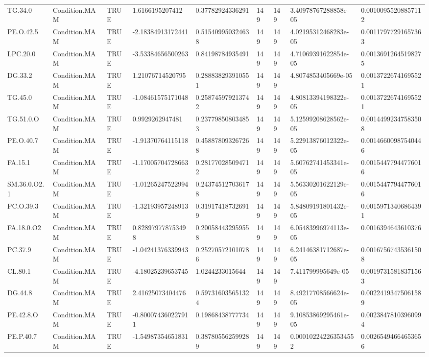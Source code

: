 \begin{longtable}{lllllllll}
TG.34.0 & Condition.MAM & TRUE & 1.6166195207412 & 0.37782924336291 & 149 & 149 & 3.40978767288858e-05 & 0.00100955208857112 \\
PE.O.42.5 & Condition.MAM & TRUE & -2.18384913172441 & 0.515409950324638 & 149 & 149 & 4.02195312468283e-05 & 0.00117977291657363 \\
LPC.20.0 & Condition.MAM & TRUE & -3.53384656500263 & 0.84198784935491 & 149 & 149 & 4.71069391622854e-05 & 0.00136912645198275 \\
DG.33.2 & Condition.MAM & TRUE & 1.21076714520795 & 0.288838293910551 & 149 & 149 & 4.8074853405669e-05 & 0.00137226741695521 \\
TG.45.0 & Condition.MAM & TRUE & -1.08461575171048 & 0.258745979213742 & 149 & 149 & 4.80813394198322e-05 & 0.00137226741695521 \\
TG.51.0.O & Condition.MAM & TRUE & 0.9929262947481 & 0.237798508034853 & 149 & 149 & 5.12599208628562e-05 & 0.00144992347583508 \\
PE.O.40.7 & Condition.MAM & TRUE & -1.91370764115118 & 0.458878093267268 & 149 & 149 & 5.22913876012322e-05 & 0.00146600987540446 \\
FA.15.1 & Condition.MAM & TRUE & -1.17005704728663 & 0.281770285094712 & 149 & 149 & 5.60762741453341e-05 & 0.00154477944776016 \\
SM.36.0.O2.1 & Condition.MAM & TRUE & -1.01265247522994 & 0.243745127036178 & 149 & 149 & 5.56330201622129e-05 & 0.00154477944776016 \\
PC.O.39.3 & Condition.MAM & TRUE & -1.32193957248913 & 0.319174187326919 & 149 & 149 & 5.84809191801432e-05 & 0.00159713406864391 \\
FA.18.0.O2 & Condition.MAM & TRUE & 0.828979778753498 & 0.200584432959558 & 149 & 149 & 6.05483996974113e-05 & 0.0016394643610376 \\
PC.37.9 & Condition.MAM & TRUE & -1.04241376339943 & 0.252705721010786 & 149 & 149 & 6.24146381712687e-05 & 0.00167567435361508 \\
CL.80.1 & Condition.MAM & TRUE & -4.18025239653745 & 1.0244233015644 & 149 & 149 & 7.411799995649e-05 & 0.00197315818371563 \\
DG.44.8 & Condition.MAM & TRUE & 2.41625073404476 & 0.597316035651324 & 149 & 149 & 8.49217708566624e-05 & 0.00224193475061589 \\
PE.42.8.O & Condition.MAM & TRUE & -0.800074360227911 & 0.19868438777734 & 149 & 149 & 9.10853869295461e-05 & 0.00238478103960994 \\
PE.P.40.7 & Condition.MAM & TRUE & -1.54987354651831 & 0.387805562599289 & 149 & 149 & 0.000102242263534552 & 0.00265494664653656 \\

\end{longtable}
